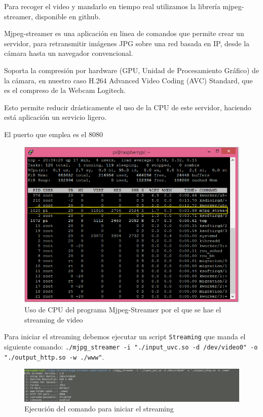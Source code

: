 \documentclass[twoside, 12pt]{epstfg}
\begin{document}
Para recoger el video y mandarlo en tiempo real utilizamos la librería mjpeg-streamer, disponible en github.

Mjpeg-streamer es una aplicación en linea de comandos que permite crear un servidor, para retransmitir imágenes JPG sobre una red basada en IP, desde la cámara hasta un navegador convencional.

Soporta la compresión por hardware (GPU, Unidad de Procesamiento Gráfico) de la cámara, en nuestro caso H.264 Advanced Video Coding (AVC) Standard, que es el compreso de la Webcam Logitech.

Esto permite reducir drásticamente el uso de la CPU de este servidor, haciendo está aplicación un servicio ligero.

El puerto que emplea es el 8080

\begin{figure}[h!]
	\centerline{
		\mbox{\includegraphics[width=.80\textwidth]{images/UsoCPUMjpeg.png}}
	}
	\caption{Uso de CPU del programa Mjpeg-Streamer por el que se hae el streaming de video}
\end{figure}


Para iniciar el streaming debemos ejecutar un script \texttt{Streaming} que manda el siguiente comando: \texttt{./mjpg\_streamer -i "./input\_uvc.so -d /dev/video0" -o "./output\_http.so -w ./www"}.



\begin{figure}[h!]
	\centerline{
		\mbox{\includegraphics[width=.80\textwidth]{images/Streamingcomando.png}}
	}
	\caption{Ejecución del comando para iniciar el streaming}
\end{figure}
\end{document}
